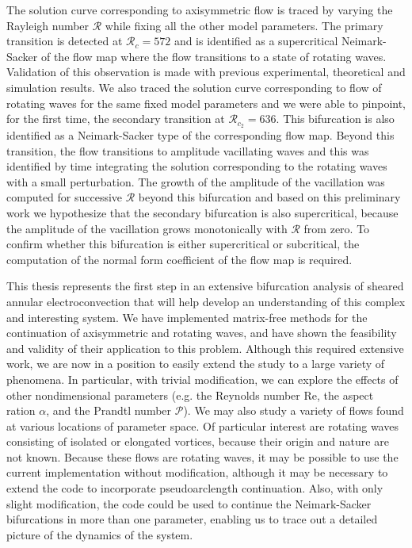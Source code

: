 The solution curve corresponding to axisymmetric flow is traced by varying the Rayleigh number $\mathcal{R}$ while fixing all the other model parameters. The primary transition is detected at $\mathcal{R}_c = 572$ and is identified as a supercritical Neimark-Sacker of the flow map where the flow transitions to a state of rotating waves. Validation of this observation is made with previous experimental, theoretical and simulation results. We also traced the solution curve corresponding to flow of rotating waves for the same fixed model parameters and we were able to pinpoint, for the first time, the secondary transition at $\mathcal{R}_{c_2} = 636$. This bifurcation is also identified as a Neimark-Sacker type of the corresponding flow map. Beyond this transition, the flow transitions to amplitude vacillating waves and this was identified by time integrating the solution corresponding to the rotating waves with a small perturbation.  The growth of the amplitude of the vacillation was computed for successive $\mathcal{R}$ beyond this bifurcation and based on this preliminary work we hypothesize that the secondary bifurcation is also supercritical, because the amplitude of the vacillation grows monotonically with $\mathcal{R}$ from zero. To confirm whether this bifurcation is either supercritical or subcritical, the computation of the normal form coefficient of the flow map is required.

This thesis represents the first step in an extensive bifurcation analysis of sheared annular electroconvection that will help develop an understanding of this complex and interesting system.  We have implemented {matrix-free} methods for the continuation of axisymmetric and rotating waves, and have shown the feasibility and validity of their application to this problem.  Although this required extensive work, we are now in a position to easily extend the study to a large variety of phenomena.  In particular, with trivial modification, we can explore the effects of other nondimensional parameters (e.g. the Reynolds number $\mathrm{Re}$, the aspect ration $\alpha$, and the Prandtl number $\mathcal{P}$).  We may also study a variety of flows found at various locations of parameter space.  Of particular interest are rotating waves consisting of isolated or elongated vortices, because their origin and nature are not known.   Because these flows are rotating waves, it may be possible to use the current implementation without modification, although it may be necessary to extend the code to incorporate pseudoarclength continuation. Also, with only slight modification, the code could be used to continue the {Neimark-Sacker} bifurcations in more than one parameter, enabling us to trace out a detailed picture of the dynamics of the system.

